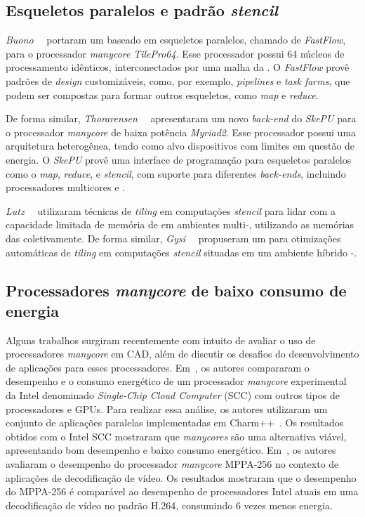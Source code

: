\subsection{Esqueletos paralelos e padrão \textit{stencil}}
\emph{Buono}~\etal~\cite{buono13} portaram um \fw baseado em esqueletos paralelos,
chamado de \emph{FastFlow}, para o processador \textit{manycore} \emph{TilePro64}.
Esse processador possui 64 núcleos de processamento idênticos, interconectados
por uma malha da \noc. O \fw \emph{FastFlow} provê padrões de \textit{design}
customizáveis, como, por exemplo, \textit{pipelines} e \textit{task farms},
que podem ser compostas para formar outros esqueletos, como \textit{map} e
\textit{reduce}.

De forma similar, \emph{Thorarensen}~\etal~\cite{thoraransen16} apresentaram um
novo \textit{back-end} do \fw \emph{SkePU} para o processador \textit{manycore}
de baixa potência \emph{Myriad2}. Esse processador possui uma arquitetura
heterogênea, tendo como alvo dispositivos com limites em questão de energia.
O \fw \emph{SkePU} provê uma interface de programação para esqueletos paralelos
como o \textit{map}, \textit{reduce}, e \textit{stencil}, com suporte para
diferentes \textit{back-ends}, incluindo processadores multicores e \gpus.

\emph{Lutz}~\etal~\cite{lutz13} utilizaram técnicas de \textit{tiling} em
computações \textit{stencil} para lidar com a capacidade limitada de memória
de \gpus em ambientes multi-\gpu, utilizando as memórias das \gpus
coletivamente. De forma similar, \emph{Gysi}~\etal~\cite{gysi15} propuseram um \fw
para otimizações automáticas de \textit{tiling} em computações \textit{stencil}
situadas em um ambiente híbrido \cpu{}-\gpu.


\subsection{Processadores \textit{manycore} de baixo consumo de energia}
Alguns trabalhos surgiram recentemente com intuito de avaliar o uso de
processadores \emph{manycore} em CAD, além de discutir os desafios do
desenvolvimento de aplicações para esses processadores.
Em~\cite{SCCEnergy:2012}, os autores compararam o desempenho e o consumo
energético de um processador \emph{manycore} experimental da Intel denominado
\emph{Single-Chip Cloud Computer} (SCC) com outros tipos de processadores e
GPUs. Para realizar essa análise, os autores utilizaram um conjunto de
aplicações paralelas implementadas em Charm++~\cite{Charm:2012}. Os resultados
obtidos com o Intel SCC mostraram que \emph{manycores} são uma alternativa
viável, apresentando bom desempenho e baixo consumo energético.
Em~\cite{MPPA-1:2013}, os autores avaliaram o desempenho do processador
\emph{manycore} MPPA-256 no contexto de aplicações de decodificação de vídeo. Os
resultados mostraram que o desempenho do MPPA-256 é comparável ao desempenho de
processadores Intel atuais em uma decodificação de vídeo no padrão H.264,
consumindo 6 vezes menos energia.

